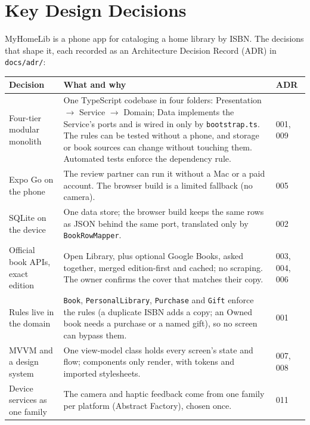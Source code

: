 \documentclass[12pt]{article}
\begin{document}
\newpage

\tableofcontents

\newpage

\section*{Key Design Decisions}

MyHomeLib is a phone app for cataloging a home library by ISBN. The decisions that shape it, each recorded as an Architecture Decision Record (ADR) in \texttt{docs/adr/}:

\medskip
\noindent
\begin{small}
\begin{tabular}{|L{4.2cm}|L{9.6cm}|L{1.4cm}|}
\hline
\textbf{Decision} & \textbf{What and why} & \textbf{ADR} \\
\hline
Four-tier modular monolith & One TypeScript codebase in four folders: Presentation $\rightarrow$ Service $\rightarrow$ Domain; Data implements the Service's ports and is wired in only by \texttt{bootstrap.ts}. The rules can be tested without a phone, and storage or book sources can change without touching them. Automated tests enforce the dependency rule. & 001, 009 \\
\hline
Expo Go on the phone & The review partner can run it without a Mac or a paid account. The browser build is a limited fallback (no camera). & 005 \\
\hline
SQLite on the device & One data store; the browser build keeps the same rows as JSON behind the same port, translated only by \texttt{BookRowMapper}. & 002 \\
\hline
Official book APIs, exact edition & Open Library, plus optional Google Books, asked together, merged edition-first and cached; no scraping. The owner confirms the cover that matches their copy. & 003, 004, 006 \\
\hline
Rules live in the domain & \texttt{Book}, \texttt{PersonalLibrary}, \texttt{Purchase} and \texttt{Gift} enforce the rules (a duplicate ISBN adds a copy; an Owned book needs a purchase or a named gift), so no screen can bypass them. & 001 \\
\hline
MVVM and a design system & One view-model class holds every screen's state and flow; components only render, with tokens and imported stylesheets. & 007, 008 \\
\hline
Device services as one family & The camera and haptic feedback come from one family per platform (Abstract Factory), chosen once. & 011 \\

\end{tabular}
\end{small}
\end{document}
